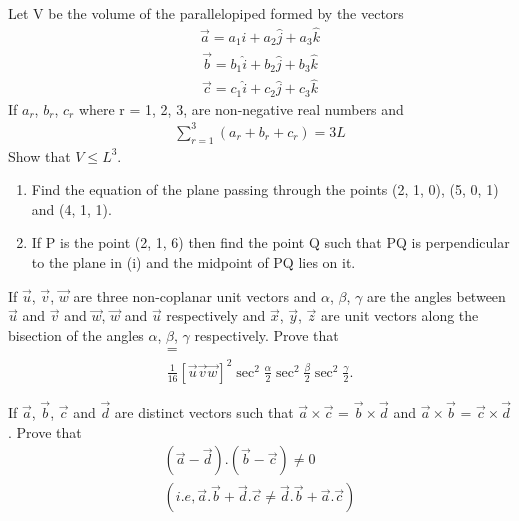 \item Let V be the volume of the parallelopiped formed by the vectors
\begin{align*}
\overrightarrow{a} = a_1\hat{i} + a_2\hat{j} + a_3\hat{k}
\end{align*}
\begin{align*}
\overrightarrow{b} = b_1\hat{i} + b_2\hat{j} + b_3\hat{k}
\end{align*}
\begin{align*}
\overrightarrow{c} = c_1\hat{i} + c_2\hat{j} + c_3\hat{k}
\end{align*}
If $a_r$, $b_r$, $c_r$ where r = 1, 2, 3, are non-negative real numbers and 
\begin{align*}
\sum_{r=1}^{3}(a_r + b_r + c_r)=3L
\end{align*}
Show that $V \leq L^{3}$.

\item 
\begin{enumerate}
\item Find the equation of the plane passing through the points (2, 1, 0), (5, 0, 1) and (4, 1, 1).
\item If P is the point (2, 1, 6) then find the point Q such that PQ is perpendicular to the plane in (i) and the midpoint of PQ lies on it.
\end{enumerate}

\item If $\overrightarrow{u}$, $\overrightarrow{v}$, $\overrightarrow{w}$ are three non-coplanar unit vectors and $\alpha$, $\beta$, $\gamma$ are the angles between $\overrightarrow{u}$ and $\overrightarrow{v}$ and $\overrightarrow{w}$, $\overrightarrow{w}$ and $\overrightarrow{u}$ respectively and $\overrightarrow{x}$, $\overrightarrow{y}$, $\overrightarrow{z}$ are unit vectors along the bisection of the angles $\alpha$, $\beta$, $\gamma$ respectively. Prove that
\begin{align*}
[(\overrightarrow{x} \times \overrightarrow{y})  (\overrightarrow{y} \times \overrightarrow{z}) (\overrightarrow{z} \times \overrightarrow{x})] =\\
\frac{1}{16}[\overrightarrow{u}\overrightarrow{v}\overrightarrow{w}]^{2} \sec^{2}\frac{\alpha}{2}\sec^{2}\frac{\beta}{2}\sec^{2}\frac{\gamma}{2}.
\end{align*}

\item If $\overrightarrow{a}$, $\overrightarrow{b}$, $\overrightarrow{c}$ and $\overrightarrow{d}$ are distinct vectors such that $\overrightarrow{a} \times \overrightarrow{c}$ = $\overrightarrow{b} \times 
\overrightarrow{d}$ and $\overrightarrow{a} \times \overrightarrow{b}$ = $\overrightarrow{c} \times 
\overrightarrow{d}$. Prove that
\begin{align*}
(\overrightarrow{a} - \overrightarrow{d}).(\overrightarrow{b} - \overrightarrow{c}) \neq 0 \\
(i.e, \overrightarrow{a}.\overrightarrow{b}+\overrightarrow{d}.\overrightarrow{c} \neq \overrightarrow{d}.\overrightarrow{b}+\overrightarrow{a}.\overrightarrow{c})
\end{align*}

